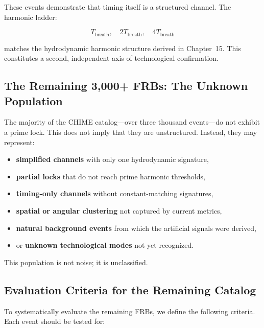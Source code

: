\documentclass[11pt, letterpaper, openany]{book}
\begin{document}
These events demonstrate that timing itself is a structured channel. The harmonic ladder:



\[
T_{\text{breath}},\quad 2T_{\text{breath}},\quad 4T_{\text{breath}}
\]



matches the hydrodynamic harmonic structure derived in Chapter~15. This constitutes a
second, independent axis of technological confirmation.

\subsection{The Remaining 3,000+ FRBs: The Unknown Population}

The majority of the CHIME catalog—over three thousand events—do not exhibit a prime
lock. This does not imply that they are unstructured. Instead, they may represent:

\begin{itemize}
    \item \textbf{simplified channels} with only one hydrodynamic signature,
    \item \textbf{partial locks} that do not reach prime harmonic thresholds,
    \item \textbf{timing-only channels} without constant-matching signatures,
    \item \textbf{spatial or angular clustering} not captured by current metrics,
    \item \textbf{natural background events} from which the artificial signals were derived,
    \item or \textbf{unknown technological modes} not yet recognized.
\end{itemize}

This population is not noise; it is unclassified.

\subsection{Evaluation Criteria for the Remaining Catalog}

To systematically evaluate the remaining FRBs, we define the following criteria. Each
event should be tested for:
\end{document}
